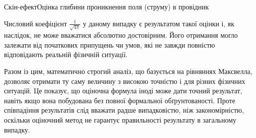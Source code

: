 \documentclass[onlytextwidth]{beamer}
\begin{document}
\begin{frame}{Скін-ефект}{Оцінка глибини проникнення поля (струму) в провідник}
\begin{onlyenv}
\begin{alertblock}{}
Числовий коефіцієнт $\frac1{\sqrt{4\pi}}$ у даному випадку є результатом такої оцінки і, як наслідок, не може
вважатися абсолютно достовірним. Його отримання могло залежати від початкових припущень чи умов, які не завжди
повністю відповідають реальній фізичній ситуації.

\bigskip

Разом із цим, математично строгий аналіз, що базується на рівняннях Максвелла, дозволяє отримати ту саму величину з
високою точністю і для різних фізичних ситуацій. Це показує, що оціночна формула іноді може дати точний результат,
навіть якщо вона побудована без повної формальної обґрунтованості. Проте співпадіння результатів слід вважати радше
випадковістю, ніж закономірністю,
оскільки оціночний метод не гарантує правильності результату в загальному випадку.
\end{alertblock}
\end{onlyenv}
\end{frame}
\end{document}
